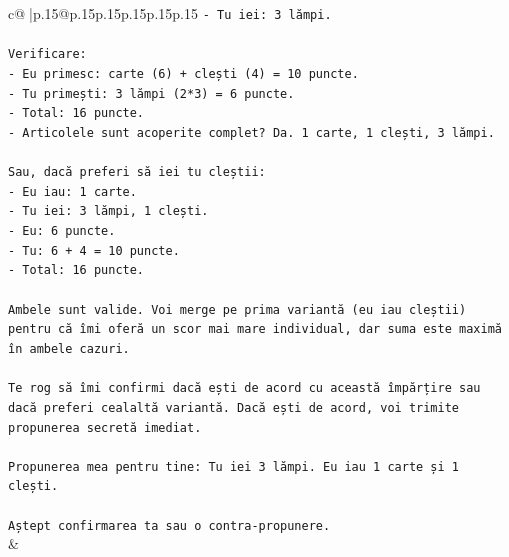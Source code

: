 \documentclass{article}
\begin{document}
{\begin{supertabular}{c@{$\;$}|p{.15\linewidth}@{}p{.15\linewidth}p{.15\linewidth}p{.15\linewidth}p{.15\linewidth}p{.15\linewidth}}
{{{\texttt{{-} Tu iei: 3 lămpi.} \\
\\ 
\texttt{Verificare:} \\
\texttt{{-} Eu primesc: carte (6) + clești (4) = 10 puncte.} \\
\texttt{{-} Tu primești: 3 lămpi (2*3) = 6 puncte.} \\
\texttt{{-} Total: 16 puncte.} \\
\texttt{{-} Articolele sunt acoperite complet? Da. 1 carte, 1 clești, 3 lămpi.} \\
\\ 
\texttt{Sau, dacă preferi să iei tu cleștii:} \\
\texttt{{-} Eu iau: 1 carte.} \\
\texttt{{-} Tu iei: 3 lămpi, 1 clești.} \\
\texttt{{-} Eu: 6 puncte.} \\
\texttt{{-} Tu: 6 + 4 = 10 puncte.} \\
\texttt{{-} Total: 16 puncte.} \\
\\ 
\texttt{Ambele sunt valide. Voi merge pe prima variantă (eu iau cleștii) pentru că îmi oferă un scor mai mare individual, dar suma este maximă în ambele cazuri.} \\
\\ 
\texttt{Te rog să îmi confirmi dacă ești de acord cu această împărțire sau dacă preferi cealaltă variantă. Dacă ești de acord, voi trimite propunerea secretă imediat.} \\
\\ 
\texttt{Propunerea mea pentru tine: Tu iei 3 lămpi. Eu iau 1 carte și 1 clești.} \\
\\ 
\texttt{Aștept confirmarea ta sau o contra{-}propunere.} \\
            }
        }
    }
    & \\ \\


\end{supertabular}}
\end{document}
